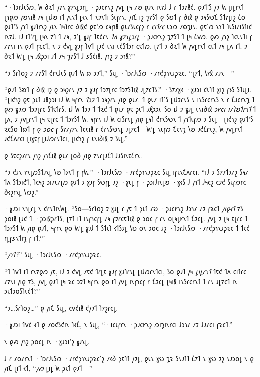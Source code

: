 “·𐑐𐑮𐑩𐑓𐑧𐑕𐑼, 𐑿 𐑔𐑷𐑑 𐑢𐑳𐑯 𐑣𐑳𐑯𐑛𐑮𐑩𐑛 ·𐑜𐑨𐑤𐑾𐑯𐑟 𐑢𐑫𐑛 𐑚𐑰 𐑥𐑹 𐑞𐑨𐑯 𐑦𐑯𐑳𐑓 𐑓 𐑩 𐑑𐑮𐑳𐑙𐑒. 𐑞𐑨𐑑'𐑕 𐑢𐑲 𐑿 𐑛𐑦𐑛𐑩𐑯𐑑 𐑚𐑪𐑞𐑼 𐑢𐑹𐑯𐑦𐑙 𐑥𐑰 𐑚𐑦𐑓𐑹 𐑦𐑑 𐑢𐑧𐑯𐑑 𐑛𐑬𐑯 𐑑 𐑯𐑲𐑯𐑑𐑦-𐑕𐑧𐑝𐑩𐑯. 𐑢𐑦𐑗 𐑦𐑟 𐑡𐑳𐑕𐑑 𐑞 𐑕𐑹𐑑 𐑝 𐑔𐑦𐑙 𐑞 𐑮𐑰𐑕𐑻𐑗 𐑕𐑑𐑳𐑛𐑦𐑟 𐑖𐑴—𐑞𐑨𐑑'𐑕 𐑢𐑪𐑑 𐑣𐑨𐑐𐑩𐑯𐑟 𐑢𐑧𐑯 𐑐𐑰𐑐𐑩𐑤 𐑔𐑦𐑙𐑒 𐑞𐑱'𐑼 𐑤𐑰𐑝𐑦𐑙 𐑞𐑧𐑥𐑕𐑧𐑤𐑝𐑟 𐑩 \emph{𐑤𐑦𐑑𐑩𐑤} 𐑧𐑮𐑼 𐑥𐑸𐑡𐑦𐑯. 𐑞𐑱'𐑼 𐑯𐑪𐑑 𐑐𐑧𐑕𐑦𐑥𐑦𐑕𐑑𐑦𐑒 𐑦𐑯𐑳𐑓. 𐑦𐑓 𐑦𐑑'𐑩𐑛 𐑚𐑰𐑯 𐑳𐑐 𐑑 𐑥𐑰, 𐑲'𐑛 𐑣𐑨𐑝 𐑑𐑱𐑒𐑩𐑯 \emph{𐑑𐑵 𐑣𐑳𐑯𐑛𐑮𐑩𐑛} ·𐑜𐑨𐑤𐑾𐑯𐑟 𐑡𐑳𐑕𐑑 𐑑 𐑚𐑰 𐑖𐑫𐑼. 𐑞𐑺 𐑢𐑪𐑟 𐑐𐑤𐑧𐑯𐑑𐑦 𐑝 𐑥𐑳𐑯𐑦 𐑦𐑯 𐑞𐑨𐑑 𐑝𐑷𐑤𐑑, 𐑯 𐑲 𐑒𐑫𐑛 𐑣𐑨𐑝 𐑐𐑫𐑑 𐑚𐑨𐑒 𐑧𐑯𐑦 𐑧𐑒𐑕𐑑𐑮𐑩 𐑤𐑱𐑑𐑼. 𐑚𐑳𐑑 𐑲 𐑔𐑷𐑑 𐑿 𐑢𐑫𐑛𐑩𐑯𐑑 𐑤𐑧𐑑 𐑥𐑰 𐑛𐑵 𐑦𐑑. 𐑲 𐑔𐑷𐑑 𐑿'𐑛 𐑚𐑰 𐑨𐑙𐑜𐑮𐑦 𐑨𐑑 𐑥𐑰 𐑡𐑳𐑕𐑑 𐑓 𐑭𐑕𐑒𐑦𐑙. 𐑢𐑪𐑟 𐑲 𐑮𐑪𐑙?”

“𐑲 𐑕𐑩𐑐𐑴𐑟 𐑲 𐑥𐑳𐑕𐑑 𐑒𐑩𐑯𐑓𐑧𐑕 𐑞𐑨𐑑 𐑿 𐑸 𐑮𐑲𐑑,” 𐑕𐑧𐑛 ·𐑐𐑮𐑩𐑓𐑧𐑕𐑼 ·𐑥𐑩𐑒𐑜𐑪𐑯𐑨𐑜𐑷𐑤. “𐑚𐑳𐑑, 𐑘𐑳𐑙 𐑥𐑨𐑯—”

“𐑞𐑨𐑑 𐑕𐑹𐑑 𐑝 𐑔𐑦𐑙 𐑦𐑟 𐑞 𐑮𐑰𐑟𐑩𐑯 𐑢𐑲 𐑲 𐑣𐑨𐑝 𐑑𐑮𐑳𐑚𐑩𐑤 𐑑𐑮𐑳𐑕𐑑𐑦𐑙 𐑨𐑛𐑳𐑤𐑑𐑕.” ·𐑕𐑳𐑥𐑣𐑬 ·𐑣𐑨𐑮𐑦 𐑒𐑧𐑐𐑑 𐑣𐑦𐑟 𐑝𐑶𐑕 𐑕𐑑𐑧𐑛𐑦. “𐑚𐑦𐑒𐑪𐑟 𐑞𐑱 𐑜𐑧𐑑 𐑨𐑙𐑜𐑮𐑦 𐑦𐑓 𐑿 𐑰𐑝𐑩𐑯 \emph{𐑑𐑮𐑲} 𐑑 𐑮𐑰𐑟𐑩𐑯 𐑢𐑦𐑞 𐑞𐑧𐑥. 𐑑 𐑞𐑧𐑥 𐑦𐑑'𐑕 𐑛𐑦𐑓𐑲𐑩𐑯𐑕 𐑯 𐑦𐑯𐑕𐑩𐑤𐑩𐑯𐑕 𐑯 𐑩 𐑗𐑨𐑤𐑩𐑯𐑡 𐑑 𐑞𐑺 𐑣𐑲𐑼 𐑑𐑮𐑲𐑚𐑩𐑤 𐑕𐑑𐑱𐑑𐑩𐑕. 𐑦𐑓 𐑿 𐑑𐑮𐑲 𐑑 𐑑𐑷𐑒 𐑑 𐑞𐑧𐑥 𐑞𐑱 𐑜𐑧𐑑 \emph{𐑨𐑙𐑜𐑮𐑦}. 𐑕𐑴 𐑦𐑓 𐑲 𐑣𐑨𐑛 𐑧𐑯𐑦𐑔𐑦𐑙 \emph{𐑮𐑾𐑤𐑦 𐑦𐑥𐑐𐑹𐑑𐑩𐑯𐑑} 𐑑 𐑛𐑵, 𐑲 𐑢𐑫𐑛𐑩𐑯𐑑 𐑚𐑰 𐑱𐑚𐑩𐑤 𐑑 𐑑𐑮𐑳𐑕𐑑 𐑿. 𐑰𐑝𐑩𐑯 𐑦𐑓 𐑿 𐑤𐑦𐑕𐑩𐑯𐑛 𐑢𐑦𐑞 𐑛𐑰𐑐 𐑒𐑩𐑯𐑕𐑻𐑯 𐑑 𐑢𐑪𐑑𐑧𐑝𐑼 𐑲 𐑕𐑧𐑛—𐑚𐑦𐑒𐑪𐑟 𐑞𐑨𐑑'𐑕 𐑷𐑤𐑕𐑴 𐑐𐑸𐑑 𐑝 𐑞 \emph{𐑮𐑴𐑤} 𐑝 𐑕𐑳𐑥𐑢𐑳𐑯 𐑐𐑤𐑱𐑦𐑙 𐑩 𐑒𐑩𐑯𐑕𐑻𐑯𐑛 𐑨𐑛𐑳𐑤𐑑—𐑿'𐑛 𐑯𐑧𐑝𐑼 𐑗𐑱𐑯𐑡 𐑘𐑹 𐑨𐑒𐑖𐑩𐑯𐑟, 𐑿 𐑢𐑫𐑛𐑩𐑯𐑑 𐑨𐑒𐑗𐑵𐑩𐑤𐑦 𐑚𐑦𐑣𐑱𐑝 𐑛𐑦𐑓𐑼𐑩𐑯𐑑𐑤𐑦, 𐑚𐑦𐑒𐑪𐑟 𐑝 𐑧𐑯𐑦𐑔𐑦𐑙 𐑲 𐑕𐑧𐑛.”

𐑞 𐑕𐑱𐑤𐑟𐑥𐑩𐑯 𐑢𐑪𐑟 𐑢𐑪𐑗𐑦𐑙 𐑞𐑧𐑥 𐑚𐑴𐑔 𐑢𐑦𐑞 𐑳𐑯𐑩𐑚𐑨𐑖𐑑 𐑓𐑨𐑕𐑦𐑯𐑱𐑖𐑩𐑯.

“𐑲 𐑒𐑨𐑯 𐑳𐑯𐑛𐑼𐑕𐑑𐑨𐑯𐑛 𐑘𐑹 𐑐𐑶𐑯𐑑 𐑝 𐑝𐑿,” ·𐑐𐑮𐑩𐑓𐑧𐑕𐑼 ·𐑥𐑩𐑒𐑜𐑪𐑯𐑨𐑜𐑷𐑤 𐑕𐑧𐑛 𐑦𐑝𐑧𐑯𐑗𐑵𐑩𐑤𐑦. “𐑦𐑓 𐑲 𐑕𐑳𐑥𐑑𐑲𐑥𐑟 𐑕𐑰𐑥 𐑑𐑵 𐑕𐑑𐑮𐑦𐑒𐑑, 𐑐𐑤𐑰𐑟 𐑮𐑦𐑥𐑧𐑥𐑚𐑼 𐑞𐑨𐑑 𐑲 𐑣𐑨𐑝 𐑕𐑻𐑝𐑛 𐑨𐑟 ·𐑣𐑧𐑛 𐑝 ·𐑜𐑮𐑦𐑓𐑦𐑯𐑛𐑹 ·𐑣𐑬𐑕 𐑓 𐑢𐑪𐑑 𐑓𐑰𐑤𐑟 𐑤𐑲𐑒 𐑕𐑧𐑝𐑼𐑩𐑤 𐑔𐑬𐑟𐑩𐑯𐑛 𐑘𐑽𐑟.”

·𐑣𐑨𐑮𐑦 𐑯𐑪𐑛𐑩𐑛 𐑯 𐑒𐑩𐑯𐑑𐑦𐑯𐑿𐑛. “𐑕𐑴—𐑕𐑩𐑐𐑴𐑟 𐑲 𐑣𐑨𐑛 𐑩 𐑢𐑱 𐑑 𐑜𐑧𐑑 𐑥𐑹 ·𐑜𐑨𐑤𐑾𐑯𐑟 𐑓𐑮𐑪𐑥 𐑥𐑲 𐑝𐑷𐑤𐑑 \emph{𐑢𐑦𐑞𐑬𐑑} 𐑳𐑕 𐑜𐑴𐑦𐑙 𐑚𐑨𐑒 𐑑 ·𐑜𐑮𐑦𐑙𐑜𐑩𐑑𐑕, 𐑚𐑳𐑑 𐑦𐑑 𐑦𐑯𐑝𐑪𐑤𐑝𐑛 𐑥𐑰 𐑝𐑲𐑩𐑤𐑱𐑑𐑦𐑙 𐑞 𐑮𐑴𐑤 𐑝 𐑩𐑯 𐑴𐑚𐑰𐑛𐑾𐑯𐑑 𐑗𐑲𐑤𐑛. 𐑢𐑫𐑛 𐑲 𐑚𐑰 𐑱𐑚𐑩𐑤 𐑑 𐑑𐑮𐑳𐑕𐑑 𐑿 𐑢𐑦𐑞 𐑞𐑨𐑑, 𐑰𐑝𐑩𐑯 𐑞𐑴 𐑿'𐑛 𐑣𐑨𐑓 𐑑 𐑕𐑑𐑧𐑐 𐑬𐑑𐑕𐑲𐑛 𐑘𐑹 𐑴𐑯 𐑮𐑴𐑤 𐑨𐑟 ·𐑐𐑮𐑩𐑓𐑧𐑕𐑼 ·𐑥𐑩𐑒𐑜𐑪𐑯𐑨𐑜𐑷𐑤 𐑑 𐑑𐑱𐑒 𐑩𐑛𐑝𐑭𐑯𐑑𐑦𐑡 𐑝 𐑦𐑑?”

“\emph{𐑢𐑪𐑑?}” 𐑕𐑧𐑛 ·𐑐𐑮𐑩𐑓𐑧𐑕𐑼 ·𐑥𐑩𐑒𐑜𐑪𐑯𐑨𐑜𐑷𐑤.

“𐑑 𐑐𐑫𐑑 𐑦𐑑 𐑩𐑯𐑳𐑞𐑼 𐑢𐑱, 𐑦𐑓 𐑲 𐑒𐑫𐑛 𐑥𐑱𐑒 𐑑𐑩𐑛𐑱 𐑣𐑨𐑝 𐑣𐑨𐑐𐑩𐑯𐑛 𐑛𐑦𐑓𐑼𐑩𐑯𐑑𐑤𐑦, 𐑕𐑴 𐑞𐑨𐑑 𐑢𐑰 \emph{𐑛𐑦𐑛𐑩𐑯𐑑} 𐑑𐑱𐑒 𐑑𐑵 𐑤𐑦𐑑𐑩𐑤 𐑥𐑳𐑯𐑦 𐑢𐑦𐑞 𐑳𐑕, 𐑢𐑫𐑛 𐑞𐑨𐑑 𐑚𐑰 𐑷𐑤 𐑮𐑲𐑑 𐑰𐑝𐑩𐑯 𐑞𐑴 𐑦𐑑 𐑢𐑫𐑛 𐑦𐑯𐑝𐑪𐑤𐑝 𐑩 𐑗𐑲𐑤𐑛 𐑚𐑰𐑦𐑙 𐑦𐑯𐑕𐑩𐑤𐑩𐑯𐑑 𐑑 𐑩𐑯 𐑨𐑛𐑳𐑤𐑑 𐑦𐑯 𐑮𐑧𐑑𐑮𐑴𐑕𐑐𐑧𐑒𐑑?”

“𐑲…𐑕𐑩𐑐𐑴𐑟…” 𐑞 𐑢𐑦𐑗 𐑕𐑧𐑛, 𐑤𐑫𐑒𐑦𐑙 𐑒𐑢𐑲𐑑 𐑐𐑳𐑟𐑩𐑤𐑛.

·𐑣𐑨𐑮𐑦 𐑑𐑫𐑒 𐑬𐑑 𐑞 𐑥𐑴𐑒𐑕𐑒𐑦𐑯 𐑐𐑬𐑗, 𐑯 𐑕𐑧𐑛, “·𐑦𐑤𐑧𐑝𐑩𐑯 ·𐑜𐑨𐑤𐑾𐑯𐑟 𐑼𐑦𐑡𐑦𐑯𐑩𐑤𐑦 𐑓𐑮𐑪𐑥 𐑥𐑲 𐑓𐑨𐑥𐑤𐑦 𐑝𐑷𐑤𐑑.”

𐑯 𐑞𐑺 𐑢𐑪𐑟 𐑜𐑴𐑤𐑛 𐑦𐑯 ·𐑣𐑨𐑮𐑦'𐑟 𐑣𐑨𐑯𐑛.

𐑓 𐑩 𐑥𐑴𐑥𐑩𐑯𐑑 ·𐑐𐑮𐑩𐑓𐑧𐑕𐑼 ·𐑥𐑩𐑒𐑜𐑪𐑯𐑨𐑜𐑷𐑤'𐑟 𐑥𐑬𐑔 𐑜𐑱𐑐𐑑 𐑢𐑲𐑛, 𐑞𐑧𐑯 𐑣𐑻 𐑡𐑷 𐑕𐑯𐑨𐑐𐑑 𐑖𐑳𐑑 𐑯 𐑣𐑻 𐑲𐑟 𐑯𐑨𐑮𐑴𐑛 𐑯 𐑞 𐑢𐑦𐑗 𐑚𐑦𐑑 𐑬𐑑, “\emph{𐑢𐑺} 𐑛𐑦𐑛 𐑿 𐑜𐑧𐑑 𐑞𐑨𐑑—”


